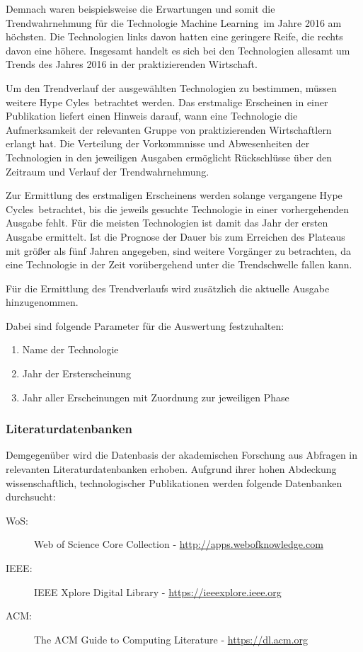 Demnach waren beispielsweise die Erwartungen und somit die Trendwahrnehmung für die Technologie \glqq Machine Learning\grqq~im Jahre 2016 am höchsten. Die Technologien links davon hatten eine geringere Reife, die rechts davon eine höhere. Insgesamt handelt es sich bei den Technologien allesamt um Trends des Jahres 2016 in der praktizierenden Wirtschaft.

Um den Trendverlauf der ausgewählten Technologien zu bestimmen, müssen weitere \glqq Hype Cyles\grqq~betrachtet werden. Das erstmalige Erscheinen in einer Publikation liefert einen Hinweis darauf, wann eine Technologie die Aufmerksamkeit der relevanten Gruppe von praktizierenden Wirtschaftlern erlangt hat. Die Verteilung der Vorkommnisse und Abwesenheiten der Technologien in den jeweiligen Ausgaben ermöglicht Rückschlüsse über den Zeitraum und Verlauf der Trendwahrnehmung.

Zur Ermittlung des erstmaligen Erscheinens werden solange vergangene \glqq Hype Cycles\grqq~betrachtet, bis die jeweils gesuchte Technologie in einer vorhergehenden Ausgabe fehlt. Für die meisten Technologien ist damit das Jahr der ersten Ausgabe ermittelt. Ist die Prognose der Dauer bis zum Erreichen des \glqq Plateaus\grqq~ mit größer als fünf Jahren angegeben, sind weitere Vorgänger zu betrachten, da eine Technologie in der Zeit vorübergehend unter die Trendschwelle fallen kann.

Für die Ermittlung des Trendverlaufs wird zusätzlich die aktuelle Ausgabe hinzugenommen.

Dabei sind folgende Parameter für die Auswertung festzuhalten:

\begin{enumerate}
	\item Name der Technologie
	\item Jahr der Ersterscheinung
	\item Jahr aller Erscheinungen mit Zuordnung zur jeweiligen Phase
\end{enumerate}

\subsubsection{Literaturdatenbanken}
Demgegenüber wird die Datenbasis der akademischen Forschung aus Abfragen in relevanten Literaturdatenbanken erhoben. Aufgrund ihrer hohen Abdeckung wissenschaftlich, technologischer Publikationen werden folgende Datenbanken durchsucht:
\begin{description}
	\item [WoS:] Web of Science Core Collection - \url{http://apps.webofknowledge.com}
	\item [IEEE:] IEEE Xplore Digital Library - \url{https://ieeexplore.ieee.org}
	\item [ACM:] The ACM Guide to Computing Literature - \url{https://dl.acm.org}
\end{description}

